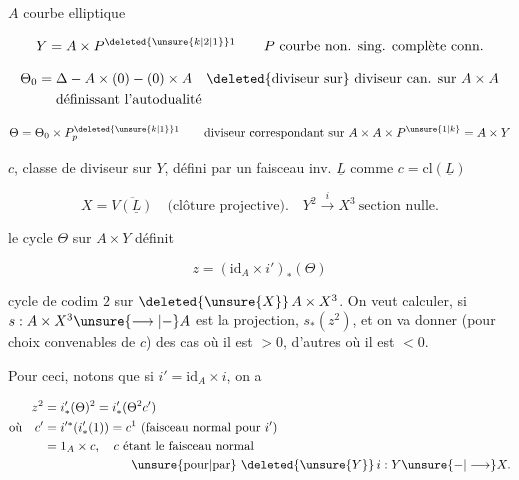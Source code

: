 
$A$ courbe elliptique

\[
Y=A\times P^{\deleted{\unsure{k|2|1}}1}\qquad\text{$P$ courbe non. sing. complète conn.}
\]

\[
\begin{aligned}
\Theta_0={}&\Delta-A\times(0)-(0)\times A\quad\text{\deleted{diviseur sur} diviseur can. sur } A\times A\\
&\text{définissant l'autodualité}
\end{aligned}
\]

\[
\Theta=\Theta_0\times P^{\deleted{\unsure{k|1}}1}_{p}\qquad\text{diviseur correspondant sur }A\times A\times P^{\unsure{1|k}}=A\times Y
\]

$c$, classe de diviseur sur $Y$, défini par un  faisceau inv. $\underline L$ comme $c=\mathrm{cl}(\underline L)$

\[
X=\overline{V(\underline L)}\quad\text{(clôture projective)}.\quad Y^2\xrightarrow{i}X^3\ \text{section nulle.}
\]

le cycle $\Theta$ sur $A\times Y$ définit

\[
z=(\mathrm{id}_A\times i')_*(\Theta)
\]

cycle de codim $2$ sur $\deleted{\unsure{X}}\,A\times X^3$. On veut calculer, si $s:A\times X^3\unsure{\longrightarrow|-}A$ est la projection, $s_*(z^2)$, et on va donner (pour  choix convenables de $c$) des cas où il est $>0$, d'autres où il est $<0$.

Pour ceci, notons que si $i'=\mathrm{id}_A\times i$, on a


\[
\begin{aligned}
z^2&=i'_*(\Theta)^2=i'_*(\Theta^2c')\\
\text{où}\quad c'&=i'^{*}(i'_*(1))=c^1\ (\text{faisceau normal pour }i')\\
&=1_A\times c,\quad c\ \text{étant le faisceau normal}\\
&\hspace{7em}\text{\unsure{pour|par} }\deleted{\unsure{Y}}\,i:Y\unsure{-|\longrightarrow} X.
\end{aligned}
\]

